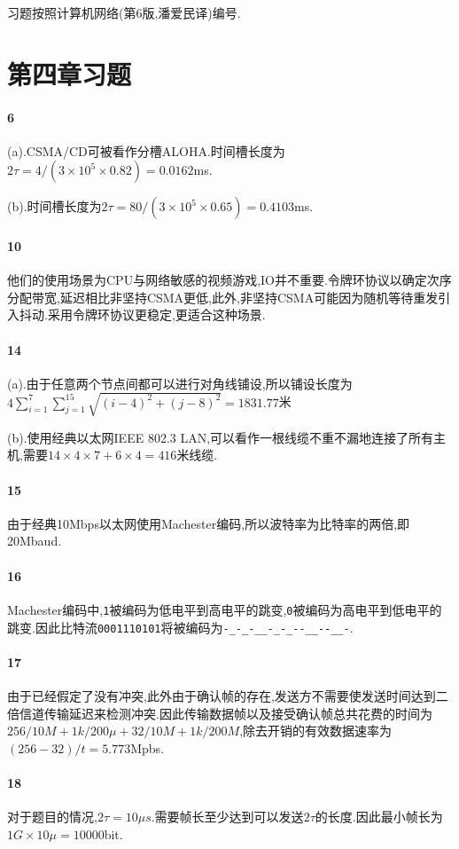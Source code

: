 \documentclass[a4paper]{article}
\begin{document}
\courseheader
{}
习题按照计算机网络(第6版,潘爱民译)编号.
\section{第四章习题}
\paragraph{6} (a).CSMA/CD可被看作分槽ALOHA.时间槽长度为$2\tau=4/(3\times10^5\times0.82)=0.0162$ms.

(b).时间槽长度为$2\tau=80/(3\times10^5\times0.65)=0.4103$ms.
\paragraph{10}
他们的使用场景为CPU与网络敏感的视频游戏,IO并不重要.令牌环协议以确定次序分配带宽,延迟相比非坚持CSMA更低,此外,非坚持CSMA可能因为随机等待重发引入抖动.采用令牌环协议更稳定,更适合这种场景.
\paragraph{14}
(a).由于任意两个节点间都可以进行对角线铺设,所以铺设长度为$4\sum_{i=1}^7\sum_{j=1}^{15}\sqrt{(i-4)^2+(j-8)^2}=1831.77$米

(b).使用经典以太网IEEE 802.3 LAN,可以看作一根线缆不重不漏地连接了所有主机,需要$14\times4\times7+6\times4=416$米线缆.
\paragraph{15}
由于经典10Mbps以太网使用Machester编码,所以波特率为比特率的两倍,即20Mbaud.
\paragraph{16}
Machester编码中,\verb|1|被编码为低电平到高电平的跳变,\verb|0|被编码为高电平到低电平的跳变.因此比特流\verb|0001110101|将被编码为\verb|-_-_-__-_-_--__--__-|.
\paragraph{17}
由于已经假定了没有冲突,此外由于确认帧的存在,发送方不需要使发送时间达到二倍信道传输延迟来检测冲突.因此传输数据帧以及接受确认帧总共花费的时间为$256/10M+1k/200\mu+32/10M+1k/200M$,除去开销的有效数据速率为$(256-32)/t=5.773$Mpbs.
\paragraph{18}
对于题目的情况,$2\tau=10\mu s$.需要帧长至少达到可以发送$2\tau$的长度.因此最小帧长为$1G\times10\mu=10000$bit.
\end{document}
